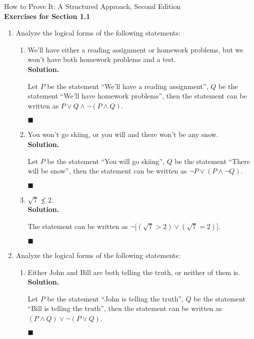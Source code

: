 \documentclass{report}
\newcommand{\sol}{\vspace{1em}\\\textbf{Solution.}\vspace{0.5em}}
\newcommand{\qed}{\ \\\strut\hfill$\blacksquare$\vspace{1em}}
\begin{document}
\begin{center}
      \Large{How to Prove It: A Structured Approach, Second Edition}\\
      \vspace{1em}
      \Large{\textbf{Exercises for Section 1.1}}\vspace{1em}
\end{center}
\begin{enumerate}[leftmargin=*]
      \item  Analyze the logical forms of the following statements:
            \begin{enumerate}
                  \item We'll have either a reading assignment or homework problems, but we won't have
                        both homework problems and a test. \sol{}

                        Let $P$ be the statement ``We'll have a reading assignment'', $Q$ be the
                        statement ``We'll have homework problems'', then the statement can be written
                        as $P \vee Q \wedge \neg(P \wedge Q)$. \qed

                  \item You won't go skiing, or you will and there won't be any snow. \sol{}

                        Let $P$ be the statement ``You will go skiing'', $Q$ be the statement ``There
                        will be snow'', then the statement can be written as $\neg P \vee (P \wedge
                              \neg Q)$. \qed

                  \item $\sqrt{7} \nleq 2$.
                        \sol{}

                        The statement can be written as $\neg\big[(\sqrt{7} > 2) \vee (\sqrt{7} =
                                    2)\big]$. \qed
            \end{enumerate}
      \item Analyze the logical forms of the following statements:
            \begin{enumerate}
                  \item  Either John and Bill are both telling the truth, or neither of them is. \sol{}

                        Let $P$ be the statement ``John is telling the truth'', $Q$ be the statement
                        ``Bill is telling the truth'', then the statement can be written as $(P \wedge
                              Q) \vee \neg(P \vee Q)$. \qed


\end{enumerate}
\end{enumerate}
\end{document}
